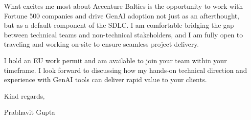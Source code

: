 \documentclass[11pt,a4paper]{article}
\begin{document}
\vspace{1em}

\noindent
What excites me most about Accenture Baltics is the opportunity to work with Fortune 500 companies and drive GenAI adoption not just as an afterthought, but as a default component of the SDLC. I am comfortable bridging the gap between technical teams and non-technical stakeholders, and I am fully open to traveling and working on-site to ensure seamless project delivery.

\vspace{1em}

\noindent
I hold an EU work permit and am available to join your team within your timeframe. I look forward to discussing how my hands-on technical direction and experience with GenAI tools can deliver rapid value to your clients.

\vspace{2em}

\noindent
Kind regards,

\vspace{1em}

\noindent
Prabhavit Gupta
\end{document}
